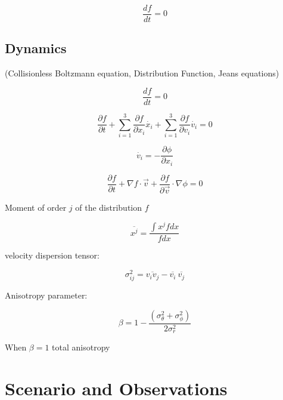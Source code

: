 \begin{equation}
\dfrac{df}{dt}=0
\end{equation}

\subsection{Dynamics}

(Collisionless Boltzmann equation, Distribution Function, Jeans equations)

\begin{equation}
\frac{df}{dt}=0
\end{equation}

\begin{equation}
\frac{\partial f}{\partial t}+\sum_{i=1}^{3}\frac{\partial f}{\partial x_{i}}\dot{x_{i}}+\sum_{i=1}^{3}\frac{\partial f}{\partial v_{i}}\dot{v_{i}}=0
\end{equation}


\begin{equation}
\dot{v_{i}}=-\frac{\partial\phi}{\partial x_{i}}
\end{equation}

\begin{equation}
\frac{\partial f}{\partial t}+\nabla f\cdot\vec{v}+\frac{\partial f}{\partial\overrightarrow{v}}\cdot\nabla\phi=0
\end{equation}

Moment of order $j$ of the distribution $f$

\begin{equation}
\overline{x^{j}}=\frac{\int x^{j}fdx}{fdx}
\end{equation}

velocity dispersion tensor:

\begin{equation}
\sigma_{ij}^{2}=\overline{v_{i}v_{j}}-\overline{v_{i}}\:\overline{v_{j}}
\end{equation}

Anisotropy parameter:

\begin{equation}
\beta=1-\frac{\left(\sigma_{\theta}^{2}+\sigma_{\phi}^{2}\right)}{2\sigma_{r}^{2}}
\end{equation}

When $\beta=1$ total anisotropy

\section{Scenario and Observations}

